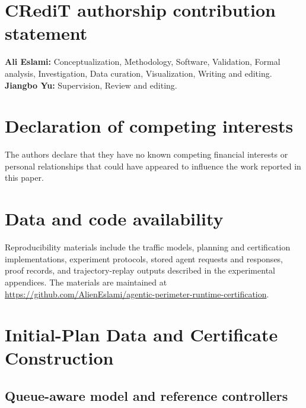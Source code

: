 \documentclass[preprint,12pt]{elsarticle}
\begin{document}
\FloatBarrier
\section*{CRediT authorship contribution statement}
\textbf{Ali Eslami:} Conceptualization, Methodology, Software, Validation,
Formal analysis, Investigation, Data curation, Visualization,
Writing and editing.
\textbf{Jiangbo Yu:} Supervision, Review and editing.

\section*{Declaration of competing interests}
The authors declare that they have no known competing financial interests or
personal relationships that could have appeared to influence the work
reported in this paper.

\section*{Data and code availability}
Reproducibility materials include the traffic models, planning and
certification implementations, experiment protocols, stored agent requests
and responses, proof records, and trajectory-replay outputs described in the
experimental appendices. The materials are maintained at
\url{https://github.com/AlienEslami/agentic-perimeter-runtime-certification}.


\appendix
\renewcommand{\theequation}{\Alph{section}.\arabic{equation}}
\section{Initial-Plan Data and Certificate Construction}
\label{app:new-model}

\subsection{Queue-aware model and reference controllers}
\end{document}
